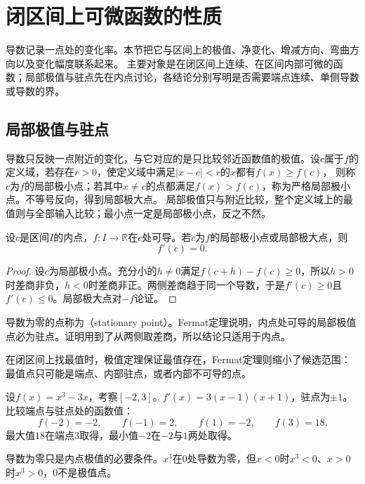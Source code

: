 \section{闭区间上可微函数的性质}
\label{sec:ru-interval-differentiable}

导数记录一点处的变化率。本节把它与区间上的极值、净变化、增减方向、弯曲方向以及变化幅度联系起来。
主要对象是在闭区间上连续、在区间内部可微的函数；局部极值与驻点先在内点讨论，各结论分别写明是否需要端点连续、单侧导数或导数的界。

\subsection{局部极值与驻点}
\label{sec:ru-local-extrema}

导数只反映一点附近的变化，与它对应的是只比较邻近函数值的极值。设$c$属于$f$的定义域，若存在$r>0$，使定义域中满足$|x-c|<r$的$x$都有$f(x)\geq f(c)$，
则称$c$为$f$的局部极小点；若其中$x\neq c$的点都满足$f(x)>f(c)$，称为严格局部极小点。不等号反向，得到局部极大点。
局部极值只与附近比较，整个定义域上的最值则与全部输入比较；最小点一定是局部极小点，反之不然。
\begin{theorem}[Fermat定理]
\label{thm:analysis-fermat}
设$c$是区间$I$的内点，$f:I\to\mathbb R$在$c$处可导。若$c$为$f$的局部极小点或局部极大点，则
\begin{equation}
 f'(c)=0.
 \label{eq:analysis-scalar-first-order-necessary}
\end{equation}
\end{theorem}
\begin{proof}
设$c$为局部极小点。充分小的$h\neq0$满足$f(c+h)-f(c)\geq0$，所以$h>0$时差商非负，$h<0$时差商非正。两侧差商趋于同一个导数，于是$f'(c)\geq0$且$f'(c)\leq0$。局部极大点对$-f$论证。
\end{proof}
导数为零的点称为（stationary point）。Fermat定理说明，内点处可导的局部极值点必为驻点。证明用到了从两侧取差商，所以结论只适用于内点。

在闭区间上找最值时，极值定理保证最值存在，Fermat定理则缩小了候选范围：最值点只可能是端点、内部驻点，或者内部不可导的点。
\begin{example}[三次多项式在闭区间上的最值]
\label{ex:ru-cubic-extrema-interval}
设$f(x)=x^3-3x$，考察$[-2,3]$。$f'(x)=3(x-1)(x+1)$，驻点为$\pm1$。比较端点与驻点处的函数值：
\[
 f(-2)=-2,\qquad f(-1)=2,\qquad f(1)=-2,\qquad f(3)=18.
\]
最大值$18$在端点$3$取得，最小值$-2$在$-2$与$1$两处取得。
\end{example}

导数为零只是内点极值的必要条件。$x^3$在$0$处导数为零，但$x<0$时$x^3<0$、$x>0$时$x^3>0$，$0$不是极值点。

